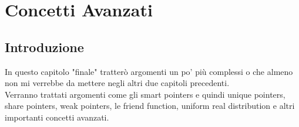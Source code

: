 
\chapter{Concetti Avanzati}












\section{Introduzione}

\textsf{\small In questo capitolo "finale" tratterò argomenti un po' più complessi o che almeno non mi verrebbe da mettere negli altri due capitoli precedenti.} \\

\textsf{\small Verranno trattati argomenti come gli smart pointers e quindi unique pointers, share pointers, weak pointers, le friend function, uniform real distribution e altri importanti concetti avanzati.} \\


